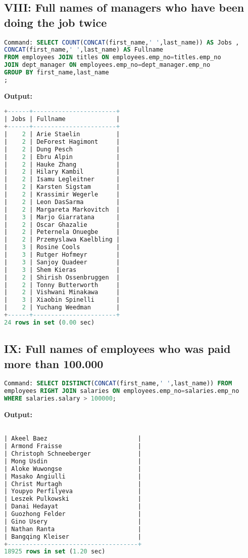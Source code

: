 \documentclass[12pt]{report}
\begin{document}
\subsection*{VIII: Full names of managers who have been doing the job twice}

\begin{lstlisting}[language=sql]
Command: SELECT COUNT(CONCAT(first_name,' ',last_name)) AS Jobs ,
CONCAT(first_name,' ',last_name) AS Fullname 
FROM employees JOIN titles ON employees.emp_no=titles.emp_no 
JOIN dept_manager ON employees.emp_no=dept_manager.emp_no 
GROUP BY first_name,last_name
;

\end{lstlisting}
\textbf{Output:}
\begin{lstlisting}[language=sql]
+------+-----------------------+
| Jobs | Fullname              |
+------+-----------------------+
|    2 | Arie Staelin          |
|    2 | DeForest Hagimont     |
|    2 | Dung Pesch            |
|    2 | Ebru Alpin            |
|    2 | Hauke Zhang           |
|    2 | Hilary Kambil         |
|    2 | Isamu Legleitner      |
|    2 | Karsten Sigstam       |
|    2 | Krassimir Wegerle     |
|    2 | Leon DasSarma         |
|    2 | Margareta Markovitch  |
|    3 | Marjo Giarratana      |
|    2 | Oscar Ghazalie        |
|    2 | Peternela Onuegbe     |
|    2 | Przemyslawa Kaelbling |
|    3 | Rosine Cools          |
|    3 | Rutger Hofmeyr        |
|    3 | Sanjoy Quadeer        |
|    3 | Shem Kieras           |
|    2 | Shirish Ossenbruggen  |
|    2 | Tonny Butterworth     |
|    2 | Vishwani Minakawa     |
|    3 | Xiaobin Spinelli      |
|    2 | Yuchang Weedman       |
+------+-----------------------+
24 rows in set (0.00 sec)

\end{lstlisting}


\subsection*{IX: Full names of employees who was paid more than 100.000}

\begin{lstlisting}[language=sql]
Command: SELECT DISTINCT(CONCAT(first_name,' ',last_name)) FROM 
employees RIGHT JOIN salaries ON employees.emp_no=salaries.emp_no 
WHERE salaries.salary > 100000;
\end{lstlisting}
\textbf{Output:}
\begin{lstlisting}[language=sql]

| Akeel Baez                         |
| Armond Fraisse                     |
| Christoph Schneeberger             |
| Mong Usdin                         |
| Aloke Wuwongse                     |
| Masako Angiulli                    |
| Christ Murtagh                     |
| Youpyo Perfilyeva                  |
| Leszek Pulkowski                   |
| Danai Hedayat                      |
| Guozhong Felder                    |
| Gino Usery                         |
| Nathan Ranta                       |
| Bangqing Kleiser                   |
+------------------------------------+
18925 rows in set (1.20 sec)

\end{lstlisting}
\end{document}
